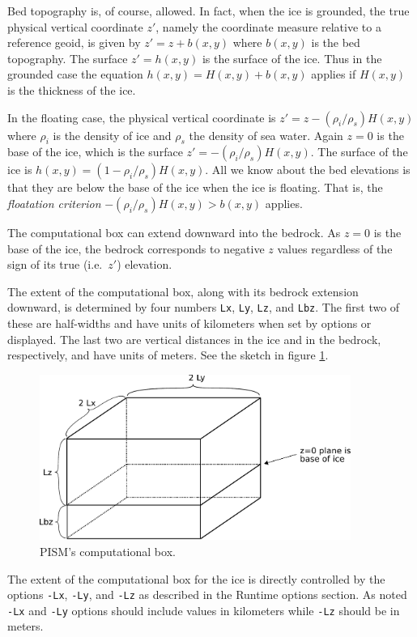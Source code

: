 \documentclass[11pt,final]{amsart}
\renewcommand{\t}[1]{\texttt{#1}}
\begin{document}
Bed topography is, of course, allowed.  In fact, when the ice is grounded, the true physical vertical coordinate $z'$, namely the coordinate measure relative to a reference geoid, is given by $z'=z+b(x,y)$ where $b(x,y)$ is the bed topography.  The surface $z'=h(x,y)$ is the surface of the ice.  Thus in the grounded case the equation $h(x,y)=H(x,y)+b(x,y)$ applies if $H(x,y)$ is the thickness of the ice.

In the floating case, the physical vertical coordinate is $z'=z-(\rho_i/\rho_s) H(x,y)$ where $\rho_i$ is the density of ice and $\rho_s$ the density of sea water.  Again $z=0$ is the base of the ice, which is the surface $z' = -(\rho_i/\rho_s) H(x,y)$.  The surface of the ice is $h(x,y) = (1-\rho_i/\rho_s) H(x,y)$.  All we know about the bed elevations is that they are below the base of the ice when the ice is floating.  That is, the \emph{floatation criterion} $-(\rho_i/\rho_s) H(x,y) > b(x,y)$ applies.

The computational box can extend downward into the bedrock.  As $z=0$ is the base of the ice, the bedrock corresponds to negative $z$ values regardless of the sign of its true (i.e.~$z'$) elevation.

The extent of the computational box, along with its bedrock extension downward, is determined by four numbers \t{Lx}, \t{Ly}, \t{Lz}, and \t{Lbz}.  The first two of these are half-widths and have units of kilometers when set by options or displayed.  The last two are vertical distances in the ice and in the bedrock, respectively, and have units of meters.  See the sketch in figure \ref{fig:rectilinearbox}.

\begin{figure}[ht]
\includegraphics[width=4.0in,keepaspectratio=true]{figs/rectilinearbox}
\caption{PISM's computational box.}
\label{fig:rectilinearbox}
\end{figure}

The extent of the computational box for the ice is directly controlled by the options \t{-Lx}, \t{-Ly}, and \t{-Lz} as described in the Runtime options section.  As noted \t{-Lx} and \t{-Ly} options should include values in kilometers while \t{-Lz} should be in meters.
\end{document}
